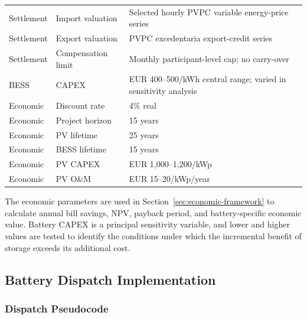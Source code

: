 \begin{longtable}{p{}p{}p{}}
Settlement & Import valuation & Selected hourly PVPC variable energy-price series \\
Settlement & Export valuation & PVPC excedentaria export-credit series \\
Settlement & Compensation limit & Monthly participant-level cap; no carry-over \\
BESS & CAPEX & EUR 400--500/kWh central range; varied in sensitivity analysis \\
Economic & Discount rate & 4\% real \\
Economic & Project horizon & 15 years \\
Economic & PV lifetime & 25 years \\
Economic & BESS lifetime & 15 years \\
Economic & PV CAPEX & EUR 1,000--1,200/kWp \\
Economic & PV O\&M & EUR 15--20/kWp/year \\
\bottomrule
\end{longtable}

The economic parameters are used in Section~\ref{sec:economic-framework} to calculate annual bill savings, NPV, payback period, and battery-specific economic value. Battery CAPEX is a principal sensitivity variable, and lower and higher values are tested to identify the conditions under which the incremental benefit of storage exceeds its additional cost.

\subsection{Battery Dispatch Implementation}
\label{sec:battery_dispatch_implementation}

\subsubsection{Dispatch Pseudocode}
\label{subsec:dispatch_pseudocode}

